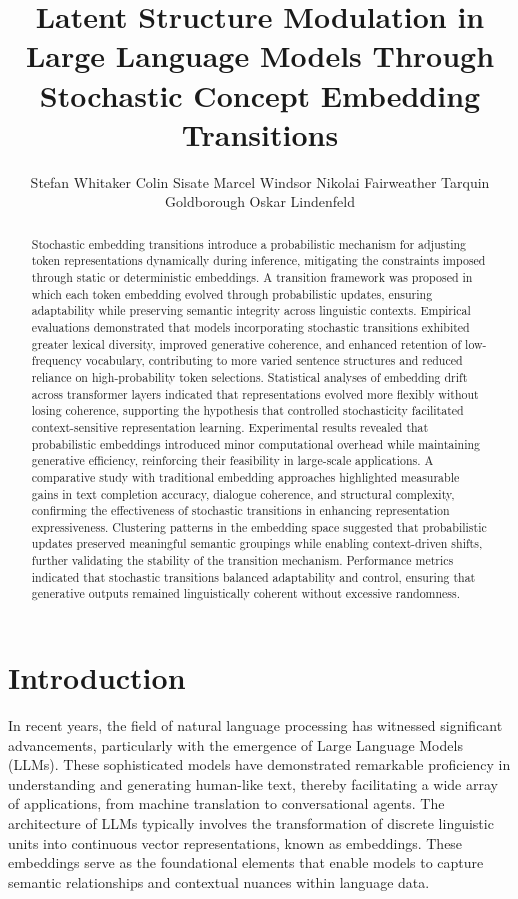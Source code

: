 \documentclass{article}
\title{Latent Structure Modulation in Large Language Models Through Stochastic Concept Embedding Transitions}
\author{
  Stefan Whitaker \And Colin Sisate  \And Marcel Windsor \And Nikolai Fairweather \And Tarquin Goldborough \And Oskar Lindenfeld
}
\begin{document}
\maketitle


\begin{abstract}
Stochastic embedding transitions introduce a probabilistic mechanism for adjusting token representations dynamically during inference, mitigating the constraints imposed through static or deterministic embeddings. A transition framework was proposed in which each token embedding evolved through probabilistic updates, ensuring adaptability while preserving semantic integrity across linguistic contexts. Empirical evaluations demonstrated that models incorporating stochastic transitions exhibited greater lexical diversity, improved generative coherence, and enhanced retention of low-frequency vocabulary, contributing to more varied sentence structures and reduced reliance on high-probability token selections. Statistical analyses of embedding drift across transformer layers indicated that representations evolved more flexibly without losing coherence, supporting the hypothesis that controlled stochasticity facilitated context-sensitive representation learning. Experimental results revealed that probabilistic embeddings introduced minor computational overhead while maintaining generative efficiency, reinforcing their feasibility in large-scale applications. A comparative study with traditional embedding approaches highlighted measurable gains in text completion accuracy, dialogue coherence, and structural complexity, confirming the effectiveness of stochastic transitions in enhancing representation expressiveness. Clustering patterns in the embedding space suggested that probabilistic updates preserved meaningful semantic groupings while enabling context-driven shifts, further validating the stability of the transition mechanism. Performance metrics indicated that stochastic transitions balanced adaptability and control, ensuring that generative outputs remained linguistically coherent without excessive randomness. 
\end{abstract}





\section{Introduction}

In recent years, the field of natural language processing has witnessed significant advancements, particularly with the emergence of Large Language Models (LLMs). These sophisticated models have demonstrated remarkable proficiency in understanding and generating human-like text, thereby facilitating a wide array of applications, from machine translation to conversational agents. The architecture of LLMs typically involves the transformation of discrete linguistic units into continuous vector representations, known as embeddings. These embeddings serve as the foundational elements that enable models to capture semantic relationships and contextual nuances within language data.
\end{document}
